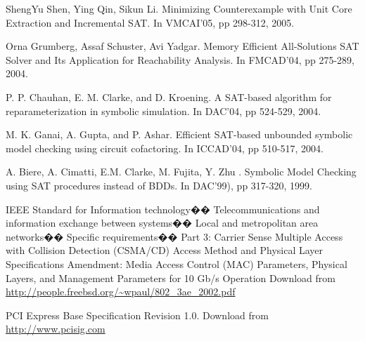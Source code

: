 \documentclass[journal]{IEEEtran}
\begin{document}
\begin{thebibliography}{1}
ShengYu Shen, Ying Qin, Sikun Li.
Minimizing Counterexample with Unit Core Extraction and Incremental SAT.
In VMCAI'05,
pp 298-312,
2005.

Orna Grumberg, Assaf Schuster, Avi Yadgar.
Memory Efficient All-Solutions SAT Solver and Its Application for Reachability Analysis.
In FMCAD'04,
pp 275-289,
2004.

P. P. Chauhan, E. M. Clarke, and D. Kroening.
A SAT-based algorithm for reparameterization in symbolic simulation.
In DAC'04,
pp 524-529,
2004.

M. K. Ganai, A. Gupta, and P. Ashar.
Efficient SAT-based unbounded symbolic model checking using circuit cofactoring.
In ICCAD'04,
pp 510-517,
2004.

A. Biere, A. Cimatti, E.M. Clarke, M. Fujita, Y. Zhu .
Symbolic Model Checking using SAT procedures instead of BDDs.
In DAC'99),
pp 317-320,
1999.

IEEE Standard for Information technology��
Telecommunications and information exchange between systems��
Local and metropolitan area networks��
Specific requirements��
Part 3: Carrier Sense Multiple Access with
Collision Detection (CSMA/CD) Access Method
and Physical Layer Specifications
Amendment: Media Access Control (MAC)
Parameters, Physical Layers, and Management
Parameters for 10 Gb/s Operation
Download from \url{http://people.freebsd.org/~wpaul/802_3ae_2002.pdf}

PCI Express Base Specification Revision 1.0.
Download from \url{http://www.pcisig.com}



\end{thebibliography}
\end{document}
